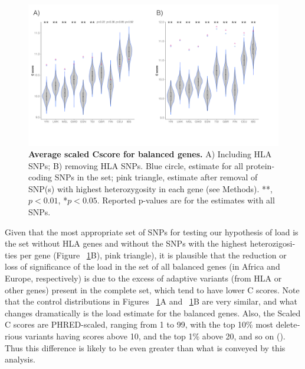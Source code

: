 \begin{refsection}
\begin{otherlanguage}{english}
\begin{figure}
\includegraphics[]{chap3_folder/figures/Cscore_combo2.png}
\caption{\textbf{Average scaled Cscore for balanced genes.} A) Including HLA SNPs; B) removing HLA SNPs. Blue circle, estimate for all protein-coding SNPs in the set; pink triangle, estimate after removal of SNP(s) with highest heterozygosity in each gene (see Methods). **, $p<0.01$, *$p<0.05$. Reported p-values are for the estimates with all SNPs.}
\label{fig:Cscore_combo}
\end{figure}



Given that the most appropriate set of SNPs for testing our hypothesis of load  is the set without HLA genes and without the SNPs with the highest heterozigosities per gene (Figure ~\ref{fig:Cscore_combo}B), pink triangle), it is plausible that the reduction or loss of significance of the load in the set of all balanced genes (in Africa and Europe, respectively) is due to the excess of adaptive variants (from HLA or other genes) present in the complete set, which tend to have lower C scores. Note that the control distributions in Figures ~\ref{fig:Cscore_combo}A and ~\ref{fig:Cscore_combo}B are very similar, and what changes dramatically is the load estimate for the balanced genes. Also, the Scaled C scores are PHRED-scaled, ranging from 1 to 99, with the top 10\% most deleterious variants having scores above 10, and the top 1\% above 20, and so on (\cite{Kircher2014}). Thus this difference is likely to be even greater than what is conveyed by this analysis.



\end{otherlanguage}
\end{refsection}
